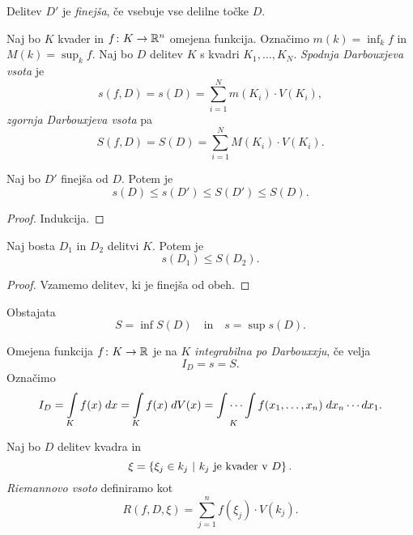 \begin{definicija}
Delitev $D'$ je \emph{finejša}, če
vsebuje vse delilne točke $D$.
\end{definicija}

\begin{definicija}
Naj bo $K$ kvader in $f \colon K \to \mathbb{R}^n$ omejena funkcija.
Označimo
$\displaystyle m(k) = \inf_k f$ in $\displaystyle M(k) = \sup_k f$.
Naj bo $D$ delitev $K$ s kvadri $K_1,\dots,K_N$.
\emph{Spodnja Darbouxjeva vsota} je
\[
s(f,D) = s(D) = \sum_{i=1}^N m(K_i) \cdot V(K_i),
\]
\emph{zgornja Darbouxjeva vsota} pa
\[
S(f,D) = S(D) = \sum_{i=1}^N M(K_i) \cdot V(K_i).
\]
\end{definicija}

\begin{trditev}
Naj bo $D'$ finejša od $D$. Potem je
\[
s(D) \leq s(D') \leq S(D') \leq S(D).
\]
\end{trditev}

\begin{proof}
Indukcija.
\end{proof}

\begin{trditev}
Naj bosta $D_1$ in $D_2$ delitvi $K$. Potem je
\[
s(D_1) \leq S(D_2).
\]
\end{trditev}

\begin{proof}
Vzamemo delitev, ki je finejša od obeh.
\end{proof}

\begin{posledica}
Obstajata
\[
S = \inf S(D) \quad \text{in} \quad s = \sup s(D).
\]
\end{posledica}

\begin{definicija}
Omejena funkcija $f \colon K \to \mathbb{R}$ je na $K$
\emph{integrabilna po Darbouxxju}, če
velja
\[
I_D = s = S.
\]
Označimo
\[
I_D = \int\limits_K f(x)\;dx = \int\limits_K f(x)\;dV(x) =
\idotsint\limits_K f(x_1,\dots,x_n)\;dx_n\cdots dx_1.
\]
\end{definicija}

\begin{definicija}
Naj bo $D$ delitev kvadra in
\[
\xi = \left\{\xi_j \in k_j~\middle\vert~\text{$k_j$ je kvader v $D$}\right\}.
\]
\emph{Riemannovo vsoto} definiramo kot
\[
R(f,D,\xi) = \sum_{j=1}^n f(\xi_j) \cdot V(k_j).
\]
\end{definicija}

